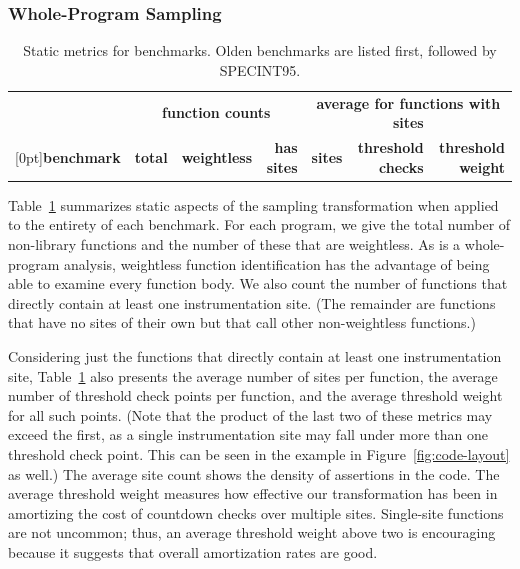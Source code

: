 \subsubsection{Whole-Program Sampling}
\label{sec:share:whole}

\begin{table}[tb]
  \centering
  \small
  \begin{tabular}{|l|rrr|rrr|}
    \hline
    & \multicolumn{3}{c|}{\textbf{function counts}} & \multicolumn{3}{c|}{\textbf{average for functions with sites}} \\
    \raisebox{1.5ex}[0pt]{\textbf{benchmark}} & \textbf{total} & \textbf{weightless} & \textbf{has sites} & \textbf{sites} & \textbf{threshold checks} & \textbf{threshold weight} \\
    \hline\hline
    
  \end{tabular}
  \caption{Static metrics for \CCured benchmarks.  Olden benchmarks
    are listed first, followed by SPECINT95.}
  \label{tab:share:static}
\end{table}

Table~\ref{tab:share:static} summarizes static aspects of the sampling
transformation when applied to the entirety of each benchmark.  For
each program, we give the total number of non-library functions and
the number of these that are weightless.  As \CCured is a
whole-program analysis, weightless function identification has the
advantage of being able to examine every function body.  We also count
the number of functions that directly contain at least one
instrumentation site.  (The remainder are functions that have no sites
of their own but that call other non-weightless functions.)

Considering just the functions that directly contain at least one
instrumentation site, Table~\ref{tab:share:static} also presents the
average number of sites per function, the average number of threshold
check points per function, and the average threshold weight for all
such points.  (Note that the product of the last two of these metrics
may exceed the first, as a single instrumentation site may fall under
more than one threshold check point.  This can be seen in the example
in Figure~\ref{fig:code-layout} as well.)  The average site count
shows the density of assertions in the code.  The average
threshold weight measures how effective our transformation has been in
amortizing the cost of countdown checks over multiple sites.
Single-site functions are not uncommon; thus, an average threshold
weight above two is encouraging because it suggests that overall
amortization rates are good.


